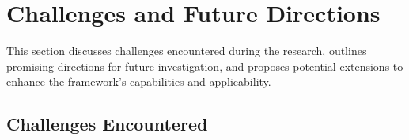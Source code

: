 \documentclass[final,5p, twocolumn]{elsarticle}
\begin{document}



\section{Challenges and Future Directions}

This section discusses challenges encountered during the research, outlines promising directions for future investigation, and proposes potential extensions to enhance the framework's capabilities and applicability.

\subsection{Challenges Encountered}\label{sec:challenges}
\end{document}
